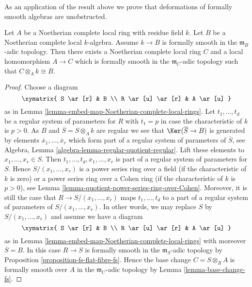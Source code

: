 \noindent
As an application of the result above we prove that deformations
of formally smooth algebras are unobstructed.

\begin{lemma}
\label{lemma-lift-fs}
Let $A$ be a Noetherian complete local ring with residue field $k$.
Let $B$ be a Noetherian complete local $k$-algebra. Assume $k \to B$
is formally smooth in the $\mathfrak m_B$-adic topology.
Then there exists a Noetherian complete local ring $C$
and a local homomorphism $A \to C$ which is formally smooth
in the $\mathfrak m_C$-adic topology such that $C \otimes_A k \cong B$.\
\end{lemma}

\begin{proof}
Choose a diagram
$$
\xymatrix{
S \ar[r] & B \\
R \ar[u] \ar[r] & A \ar[u]
}
$$
as in Lemma \ref{lemma-embed-map-Noetherian-complete-local-rings}.
Let $t_1, \ldots, t_d$ be a regular system of parameters for $R$
with $t_1 = p$ in case the characteristic of $k$ is $p > 0$.
As $B$ and $\overline{S} = S \otimes_A k$
are regular we see that $\Ker(\overline{S} \to B)$ is generated by
elements $\overline{x}_1, \ldots, \overline{x}_r$ which form part of a
regular system of parameters of $\overline{S}$, see
Algebra, Lemma \ref{algebra-lemma-regular-quotient-regular}.
Lift these elements to $x_1, \ldots, x_r \in S$. Then
$t_1, \ldots, t_d, x_1, \ldots, x_r$ is part of a regular system of
parameters for $S$. Hence $S/(x_1, \ldots, x_r)$ is a power
series ring over a field (if the characteristic of $k$ is zero)
or a power series ring over a Cohen ring (if the characteristic of
$k$ is $p > 0$), see
Lemma \ref{lemma-quotient-power-series-ring-over-Cohen}.
Moreover, it is still the case that $R \to S/(x_1, \ldots, x_r)$
maps $t_1, \ldots, t_d$ to a part of a regular system of parameters
of $S/(x_1, \ldots, x_r)$. In other words, we may replace $S$ by
$S/(x_1, \ldots, x_r)$ and assume we have a diagram
$$
\xymatrix{
S \ar[r] & B \\
R \ar[u] \ar[r] & A \ar[u]
}
$$
as in Lemma \ref{lemma-embed-map-Noetherian-complete-local-rings}
with moreover $\overline{S} = B$. In this case $R \to S$ is
formally smooth in the $\mathfrak m_S$-adic topology by
Proposition \ref{proposition-fs-flat-fibre-fs}.
Hence the base change $C = S \otimes_R A$ is formally smooth
over $A$ in the $\mathfrak m_C$-adic topology by
Lemma \ref{lemma-base-change-fs}.
\end{proof}

